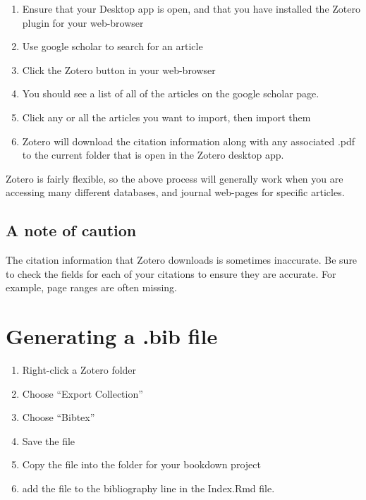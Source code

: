 \documentclass[]{book}
\providecommand{\tightlist}{%
  \setlength{\itemsep}{0pt}\setlength{\parskip}{0pt}}
\begin{document}
\begin{enumerate}
\def\labelenumi{\arabic{enumi}.}
\tightlist
\item
  Ensure that your Desktop app is open, and that you have installed the
  Zotero plugin for your web-browser
\item
  Use google scholar to search for an article
\item
  Click the Zotero button in your web-browser
\item
  You should see a list of all of the articles on the google scholar
  page.
\item
  Click any or all the articles you want to import, then import them
\item
  Zotero will download the citation information along with any
  associated .pdf to the current folder that is open in the Zotero
  desktop app.
\end{enumerate}

Zotero is fairly flexible, so the above process will generally work when
you are accessing many different databases, and journal web-pages for
specific articles.

\subsection{A note of caution}\label{a-note-of-caution}

The citation information that Zotero downloads is sometimes inaccurate.
Be sure to check the fields for each of your citations to ensure they
are accurate. For example, page ranges are often missing.

\section{Generating a .bib file}\label{generating-a-.bib-file}

\begin{enumerate}
\def\labelenumi{\arabic{enumi}.}
\tightlist
\item
  Right-click a Zotero folder
\item
  Choose ``Export Collection''
\item
  Choose ``Bibtex''
\item
  Save the file
\item
  Copy the file into the folder for your bookdown project
\item
  add the file to the bibliography line in the Index.Rmd file.
\end{enumerate}
\end{document}
